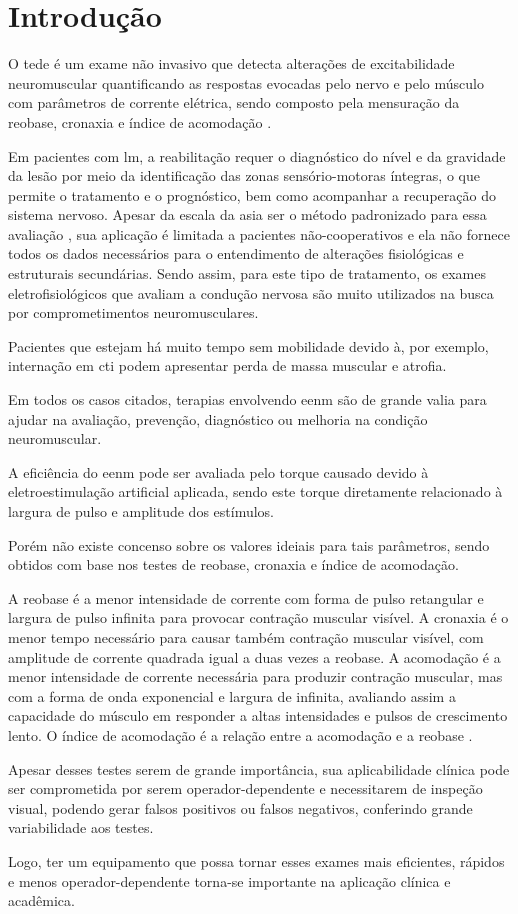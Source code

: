 \section{Introdução}

O \ac{tede} é um exame não invasivo que detecta alterações de excitabilidade neuromuscular quantificando as respostas evocadas pelo nervo e pelo músculo com parâmetros de corrente elétrica, sendo composto pela mensuração da reobase, cronaxia e índice de acomodação \cite{sluga2002,schuhfired2005,lee2013}.

Em pacientes com \ac{lm}, a reabilitação requer o diagnóstico do nível e da gravidade da lesão por meio da identificação das zonas sensório-motoras íntegras, o que permite o tratamento e o prognóstico, bem como acompanhar a recuperação do sistema nervoso. Apesar da escala da \ac{asia} ser o método padronizado para essa avaliação \cite{van2011}, sua aplicação é limitada a pacientes não-cooperativos e ela não fornece todos os dados necessários para o entendimento de alterações fisiológicas e estruturais secundárias. Sendo assim, para este tipo de tratamento, os exames eletrofisiológicos que avaliam a condução nervosa são muito utilizados na busca por comprometimentos neuromusculares.

Pacientes que estejam há muito tempo sem mobilidade devido à, por exemplo, internação em \ac{cti} podem apresentar perda de massa muscular e atrofia.

Em todos os casos citados, terapias envolvendo \ac{eenm} são de grande valia para ajudar na avaliação, prevenção, diagnóstico ou melhoria na condição neuromuscular.

A eficiência do \ac{eenm} pode ser avaliada pelo torque causado devido à eletroestimulação artificial aplicada, sendo este torque diretamente relacionado à largura de pulso e amplitude dos estímulos.

Porém não existe concenso sobre os valores ideiais para tais parâmetros, sendo obtidos com base nos testes de reobase, cronaxia e índice de acomodação. 

A reobase é a menor intensidade de corrente com forma de pulso retangular e largura de pulso infinita para provocar contração muscular visível. A cronaxia é o menor tempo necessário para causar também contração muscular visível, com amplitude de corrente quadrada igual a duas vezes a reobase. A acomodação é a menor intensidade de corrente necessária para produzir contração muscular, mas com a forma de onda exponencial e largura de infinita, avaliando assim a capacidade do músculo em responder a altas intensidades e pulsos de crescimento lento. O índice de acomodação é a relação entre a acomodação e a reobase \cite{sluga2002}.

Apesar desses testes serem de grande importância, sua aplicabilidade clínica pode ser comprometida por serem operador-dependente e necessitarem de inspeção visual, podendo gerar falsos positivos ou falsos negativos, conferindo grande variabilidade aos testes.

Logo, ter um equipamento que possa tornar esses exames mais eficientes, rápidos e menos operador-dependente torna-se importante na aplicação clínica e acadêmica.